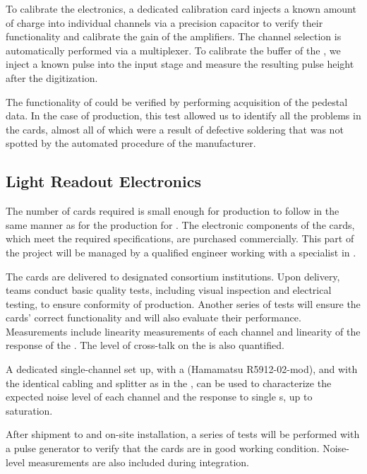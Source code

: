 To calibrate the   electronics, a dedicated calibration card %
injects  a known amount of charge into individual  channels via a precision capacitor to verify their functionality and calibrate the gain of the amplifiers. The channel selection is automatically performed via a multiplexer. To calibrate the  buffer of the  , we inject a known pulse into the input stage and measure the resulting pulse height after the digitization. 



The functionality of  could be verified by performing acquisition of the pedestal data. In the case of  production, this test allowed us to identify all the problems in the cards, almost all of which%
were a result of defective soldering that was not spotted by the automated  procedure of the manufacturer. 


\subsection{Light Readout Electronics}
\label{ssec:dp-tpcelec-prod-lro}


The number of   cards required is small enough for production to follow in the same manner as for the production for .
The electronic components of the cards, which meet the required specifications, are purchased commercially. This part of the project will be managed by a qualified engineer working with a specialist in .

The cards are delivered to designated consortium institutions. Upon delivery, teams conduct basic quality tests, including visual inspection and electrical testing, to ensure conformity of production. Another series of tests will ensure the cards' %
correct %
functionality and will also evaluate their performance. Measurements include linearity measurements of each  channel and linearity of the response of the . The level of cross-talk on the  is also quantified. %

A dedicated single-channel set up, with a  (Hamamatsu R5912-02-mod), and with the identical cabling and splitter as in the , can be used to characterize the expected noise level of each channel and the response to single \phel{}s, up to saturation. 

After shipment to  and on-site installation, a series of tests will be performed with a pulse generator to verify that the cards are in good working condition. Noise-level measurements are also included during integration.
